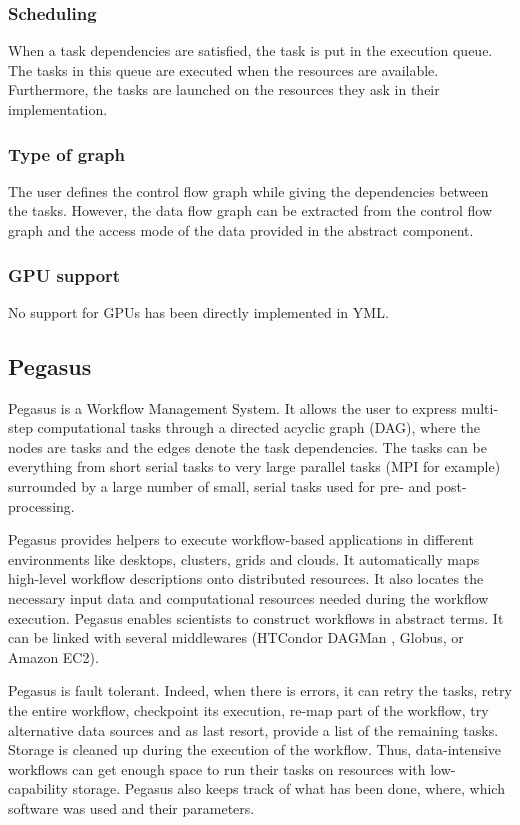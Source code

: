 \subsubsection{Scheduling}
When a task dependencies are satisfied, the task is put in the execution queue.
The tasks in this queue are executed when the resources are available.
Furthermore, the tasks are launched on the resources they ask in their implementation.

\subsubsection{Type of graph}
The user defines the control flow graph while giving the dependencies between the tasks.
However, the data flow graph can be extracted from the control flow graph and the access mode of the data provided in the abstract component.

\subsubsection{GPU support}
No support for GPUs has been directly implemented in YML.




\subsection{Pegasus}
Pegasus \cite{DSSBG2005} \cite{DVJRC2015} is a Workflow Management System.
It allows the user to express multi-step computational tasks through a directed acyclic graph (DAG), where the nodes are tasks and the edges denote the task dependencies.
The tasks can be everything  from short serial tasks to very large parallel tasks (MPI for example) surrounded by a large number of small, serial tasks used for pre- and post-processing.

Pegasus provides helpers to execute workflow-based applications in different environments like desktops, clusters, grids and clouds.
It automatically maps high-level workflow descriptions onto distributed resources.
It also locates the necessary input data and computational resources needed during the workflow execution.
Pegasus enables scientists to construct workflows in abstract terms.
It can be linked with several middlewares (HTCondor DAGMan \cite{ThaTL2002}, Globus, or Amazon EC2).

Pegasus is fault tolerant.
Indeed, when there is errors, it can retry the tasks, retry the entire workflow, checkpoint its execution, re-map part of the workflow, try alternative data sources and as last resort, provide a list of the remaining tasks.
Storage is cleaned up during the execution of the workflow.
Thus, data-intensive workflows can get enough space to run their tasks on resources with low-capability storage.
Pegasus also keeps track of what has been done, where, which software was used and their parameters.

